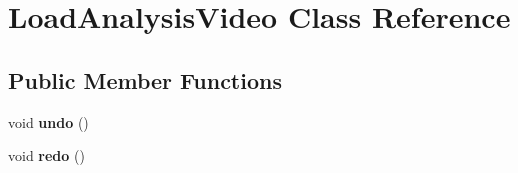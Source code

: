 \hypertarget{classUndo__Redo_1_1LoadAnalysisVideo}{}\section{Load\+Analysis\+Video Class Reference}
\label{classUndo__Redo_1_1LoadAnalysisVideo}
\subsection*{Public Member Functions}
\begin{DoxyCompactItemize}
\item 
\hypertarget{classUndo__Redo_1_1LoadAnalysisVideo_a0e1e7804a53f6d62efc72c9bdbec8571}{}void {\bfseries undo} ()\label{classUndo__Redo_1_1LoadAnalysisVideo_a0e1e7804a53f6d62efc72c9bdbec8571}

\item 
\hypertarget{classUndo__Redo_1_1LoadAnalysisVideo_a93c48d6ed036e1a381be53ac67643284}{}void {\bfseries redo} ()\label{classUndo__Redo_1_1LoadAnalysisVideo_a93c48d6ed036e1a381be53ac67643284}

\end{DoxyCompactItemize}
